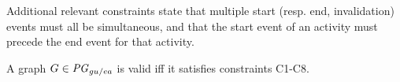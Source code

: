 Additional relevant constraints state that multiple start (resp. end, invalidation) events must all be simultaneous, and that the start event of an activity must precede the end event for that activity.
\\

\begin{definition}[Validity]
 A graph $G \in \mathit{PG}_{gu/ea}$ is valid iff it satisfies constraints C1-C8.
	\label{def:valid-guea}
\end{definition}

